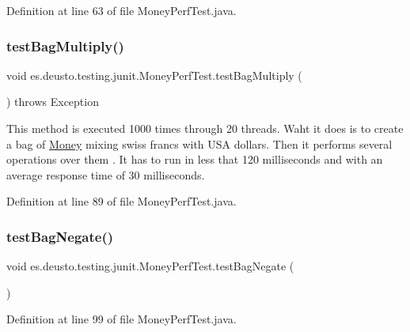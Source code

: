 Definition at line 63 of file Money\+Perf\+Test.\+java.

\mbox{\label{classes_1_1deusto_1_1testing_1_1junit_1_1_money_perf_test_ac5217e7f852f78dde2575d39a7186110}} 
\subsubsection{\texorpdfstring{testBagMultiply()}{testBagMultiply()}}
{\footnotesize\ttfamily void es.\+deusto.\+testing.\+junit.\+Money\+Perf\+Test.\+test\+Bag\+Multiply (\begin{DoxyParamCaption}{ }\end{DoxyParamCaption}) throws Exception}

This method is executed 1000 times through 20 threads. Waht it does is to create a bag of \mbox{\hyperlink{classes_1_1deusto_1_1testing_1_1junit_1_1_money}{Money}} mixing swiss francs with U\+SA dollars. Then it performs several operations over them . It has to run in less that 120 milliseconds and with an average response time of 30 milliseconds. 

Definition at line 89 of file Money\+Perf\+Test.\+java.

\mbox{\label{classes_1_1deusto_1_1testing_1_1junit_1_1_money_perf_test_a9bc7f110124f622b0717e8e12f697088}} 
\subsubsection{\texorpdfstring{testBagNegate()}{testBagNegate()}}
{\footnotesize\ttfamily void es.\+deusto.\+testing.\+junit.\+Money\+Perf\+Test.\+test\+Bag\+Negate (\begin{DoxyParamCaption}{ }\end{DoxyParamCaption})}



Definition at line 99 of file Money\+Perf\+Test.\+java.

